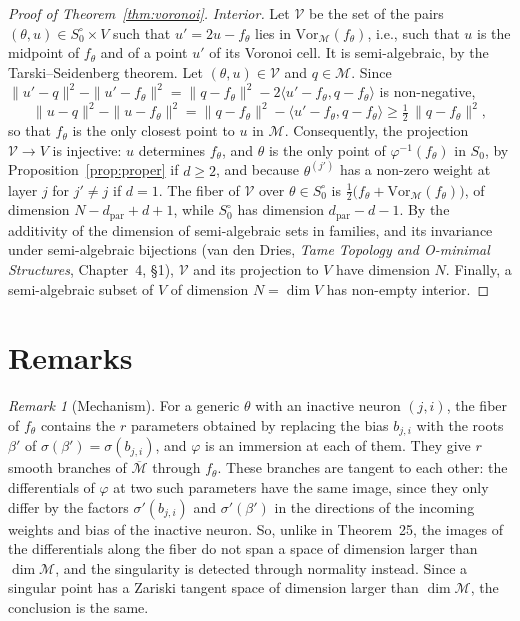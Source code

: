 \documentclass[11pt]{article}
\theoremstyle{definition}
\theoremstyle{remark}
\newtheorem{remark}[lemma]{Remark}
\newcommand{\M}{\mathcal{M}}
\newcommand{\Mbar}{\overline{\M}}
\newcommand{\dpar}{d_{\mathrm{par}}}
\begin{document}
\begin{proof}[Proof of Theorem~\ref{thm:voronoi}]
\emph{Interior.} Let $\mathcal V$ be the set of the pairs $(\theta,u)\in S_0^\circ\times V$ such that $u'=2u-f_\theta$ lies in $\mathrm{Vor}_{\M}(f_\theta)$, i.e., such that $u$ is the midpoint of $f_\theta$ and of a point $u'$ of its Voronoi cell. It is semi-algebraic, by the Tarski--Seidenberg theorem. Let $(\theta,u)\in\mathcal V$ and $q\in\M$. Since $\|u'-q\|^2-\|u'-f_\theta\|^2=\|q-f_\theta\|^2-2\langle u'-f_\theta,q-f_\theta\rangle$ is non-negative,
\[
\|u-q\|^2-\|u-f_\theta\|^2=\|q-f_\theta\|^2-\langle u'-f_\theta,q-f_\theta\rangle\ge\tfrac12\,\|q-f_\theta\|^2,
\]
so that $f_\theta$ is the only closest point to $u$ in $\M$. Consequently, the projection $\mathcal V\to V$ is injective: $u$ determines $f_\theta$, and $\theta$ is the only point of $\varphi^{-1}(f_\theta)$ in $S_0$, by Proposition~\ref{prop:proper} if $d\ge2$, and because $\theta^{(j')}$ has a non-zero weight at layer $j$ for $j'\ne j$ if $d=1$. The fiber of $\mathcal V$ over $\theta\in S_0^\circ$ is $\frac12\big(f_\theta+\mathrm{Vor}_{\M}(f_\theta)\big)$, of dimension $N-\dpar+d+1$, while $S_0^\circ$ has dimension $\dpar-d-1$. By the additivity of the dimension of semi-algebraic sets in families, and its invariance under semi-algebraic bijections (van den Dries, \emph{Tame Topology and O-minimal Structures}, Chapter~4, \S1), $\mathcal V$ and its projection to $V$ have dimension $N$. Finally, a semi-algebraic subset of $V$ of dimension $N=\dim V$ has non-empty interior.
\end{proof}

\section{Remarks}

\begin{remark}[Mechanism]
For a generic $\theta$ with an inactive neuron $(j,i)$, the fiber of $f_\theta$ contains the $r$ parameters obtained by replacing the bias $b_{j,i}$ with the roots $\beta'$ of $\sigma(\beta')=\sigma(b_{j,i})$, and $\varphi$ is an immersion at each of them. They give $r$ smooth branches of $\Mbar$ through $f_\theta$. These branches are tangent to each other: the differentials of $\varphi$ at two such parameters have the same image, since they only differ by the factors $\sigma'(b_{j,i})$ and $\sigma'(\beta')$ in the directions of the incoming weights and bias of the inactive neuron. So, unlike in Theorem~25, the images of the differentials along the fiber do not span a space of dimension larger than $\dim\M$, and the singularity is detected through normality instead. Since a singular point has a Zariski tangent space of dimension larger than $\dim\M$, the conclusion is the same.
\end{remark}
\end{document}
